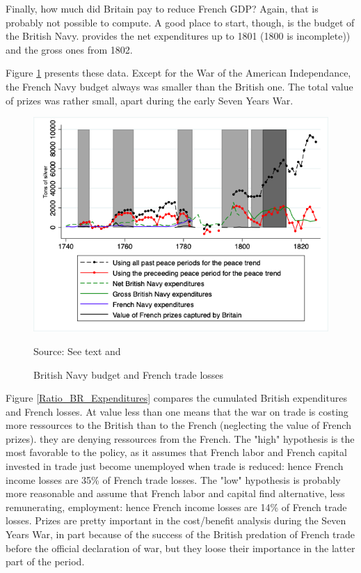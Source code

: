 \documentclass[12pt,a4paper,notitlepage,english]{article}
\newcommand{\source}[1]{\caption*{\footnotesize Source: {#1}} }
\begin{document}
Finally, how much did Britain pay to reduce French GDP? Again, that is probably not possible to compute. A good place to start, though, is the budget of the British Navy. \cite[pp. 570-587]{mitchell1988} provides the net expenditures up to 1801 (1800 is incomplete)) and the gross ones from 1802.

Figure \ref{Expenditures} presents these data. Except for the War of the American Independance, the French Navy budget always was smaller than the British one. The total value of prizes was rather small, apart during the early Seven Years War.

\begin{center}
	\begin{figure}[H]
		\caption{British Navy budget and French trade losses}
		\label{Expenditures}
		\centering
		\includegraphics[scale=0.5]{Expenditures_Annual_Loss.png}
		\source{See text and \cite[pp. 570-587]{mitchell1988}}
	\end{figure}
\end{center}


Figure \ref{Ratio_BR_Expenditures} compares the cumulated British expenditures and French losses. At value less than one means that the war on trade is costing more ressources to the British than to the French (neglecting the value of French prizes). they are denying ressources from the French.  The "high" hypothesis is the most favorable to the policy, as it assumes that French labor and French capital invested in trade just become unemployed when trade is reduced: hence French income losses are 35\% of French trade losses. The "low" hypothesis is probably more reasonable and assume that French labor and capital find alternative, less remunerating, employment: hence French income losses are 14\% of French trade losses.
Prizes are pretty important in the cost/benefit analysis during the Seven Years War, in part because of the success of the British predation of French trade before the official declaration of war, but they loose their importance in the latter part of the period.
\end{document}
